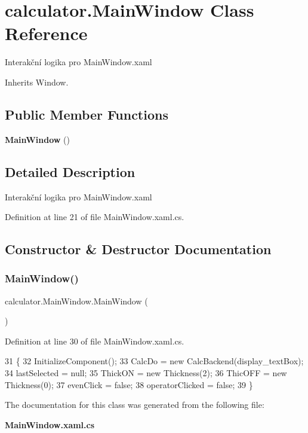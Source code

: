 \section{calculator.\+Main\+Window Class Reference}
\label{classcalculator_1_1_main_window}


Interakční logika pro Main\+Window.\+xaml  




Inherits Window.

\subsection*{Public Member Functions}
\begin{DoxyCompactItemize}
\item 
\textbf{ Main\+Window} ()
\end{DoxyCompactItemize}


\subsection{Detailed Description}
Interakční logika pro Main\+Window.\+xaml 



Definition at line 21 of file Main\+Window.\+xaml.\+cs.



\subsection{Constructor \& Destructor Documentation}
\mbox{\label{classcalculator_1_1_main_window_ad4bb8d6fad3b35029a9817ab223a372e}} 
\subsubsection{Main\+Window()}
{\footnotesize\ttfamily calculator.\+Main\+Window.\+Main\+Window (\begin{DoxyParamCaption}{ }\end{DoxyParamCaption})}



Definition at line 30 of file Main\+Window.\+xaml.\+cs.


\begin{DoxyCode}
31         \{
32             InitializeComponent();
33             CalcDo = \textcolor{keyword}{new} CalcBackend(display\_textBox);
34             lastSelected = null;
35             ThickON = \textcolor{keyword}{new} Thickness(2);
36             ThicOFF = \textcolor{keyword}{new} Thickness(0);
37             evenClick = \textcolor{keyword}{false};
38             operatorClicked = \textcolor{keyword}{false};
39         \}
\end{DoxyCode}


The documentation for this class was generated from the following file\+:\begin{DoxyCompactItemize}
\item 
\textbf{ Main\+Window.\+xaml.\+cs}\end{DoxyCompactItemize}
